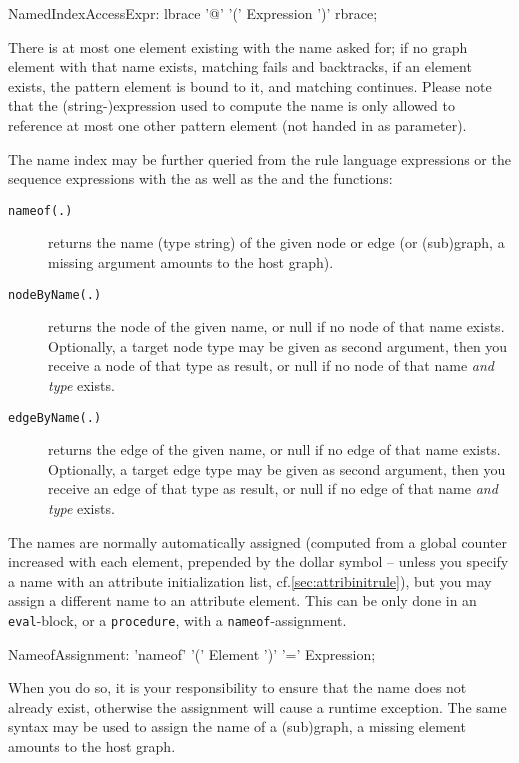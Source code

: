 \makeatletter
\begin{rail}
  NamedIndexAccessExpr:
    lbrace '@' '(' Expression ')' rbrace;
\end{rail}
\makeatother

There is at most one element existing with the name asked for; if no graph element with that name exists, matching fails and backtracks, if an element exists, the pattern element is bound to it, and matching continues.
Please note that the (string-)expression used to compute the name is only allowed to reference at most one other pattern element (not handed in as parameter).

The name index may be further queried from the rule language expressions or the sequence expressions with the \texttt{} as well as
the \texttt{} and the \texttt{} functions:
\begin{description}
\item[\texttt{nameof(.)}] returns the name (type string) of the given node or edge (or (sub)graph, a missing argument amounts to the host graph).
\item[\texttt{nodeByName(.)}] returns the node of the given name, or null if no node of that name exists. Optionally, a target node type may be given as second argument, then you receive a node of that type as result, or null if no node of that name \emph{and type} exists.
\item[\texttt{edgeByName(.)}] returns the edge of the given name, or null if no edge of that name exists. Optionally, a target edge type may be given as second argument, then you receive an edge of that type as result, or null if no edge of that name \emph{and type} exists.
\end{description}

The names are normally automatically assigned (computed from a global counter increased with each element, prepended by the dollar symbol -- unless you specify a name with an attribute initialization list, cf.\ref{sec:attribinitrule}), but you may assign a different name to an attribute element.
This can be only done in an \texttt{eval}-block, or a \texttt{procedure}, with a \texttt{nameof}-assignment.

\begin{rail}
  NameofAssignment:
    'nameof' '(' Element ')' '=' Expression;
\end{rail}

When you do so, it is your responsibility to ensure that the name does not already exist, otherwise the assignment will cause a runtime exception.
The same syntax may be used to assign the name of a (sub)graph, a missing element amounts to the host graph.

